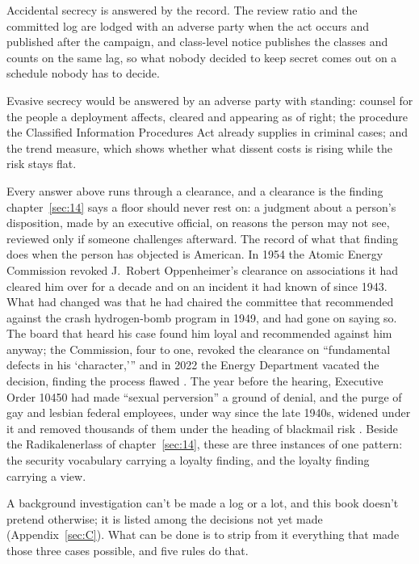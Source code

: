 Accidental secrecy is answered by the record. The review ratio and the committed log are lodged with an adverse party when the act occurs and published after the campaign, and class-level notice publishes the classes and counts on the same lag, so what nobody decided to keep secret comes out on a schedule nobody has to decide.

Evasive secrecy would be answered by an adverse party with standing: counsel for the people a deployment affects, cleared and appearing as of right; the procedure the Classified Information Procedures Act already supplies in criminal cases; and the trend measure, which shows whether what dissent costs is rising while the risk stays flat.


Every answer above runs through a clearance, and a clearance is the finding chapter~\ref{sec:14} says a floor should never rest on: a judgment about a person's disposition, made by an executive official, on reasons the person may not see, reviewed only if someone challenges afterward. The record of what that finding does when the person has objected is American. In 1954 the Atomic Energy Commission revoked J.~Robert Oppenheimer's clearance on associations it had cleared him over for a decade and on an incident it had known of since 1943. What had changed was that he had chaired the committee that recommended against the crash hydrogen-bomb program in 1949, and had gone on saying so. The board that heard his case found him loyal and recommended against him anyway; the Commission, four to one, revoked the clearance on “fundamental defects in his ‘character,’” and in 2022 the Energy Department vacated the decision, finding the process flawed \autocite{aec1954transcript,aec1954decision,doe2022oppenheimer}. The year before the hearing, Executive Order 10450 had made “sexual perversion” a ground of denial, and the purge of gay and lesbian federal employees, under way since the late 1940s, widened under it and removed thousands of them under the heading of blackmail risk \autocite{eo10450,johnson2004lavender}. Beside the Radikalenerlass of chapter~\ref{sec:14}, these are three instances of one pattern: the security vocabulary carrying a loyalty finding, and the loyalty finding carrying a view.

A background investigation can't be made a log or a lot, and this book doesn't pretend otherwise; it is listed among the decisions not yet made (Appendix~\ref{sec:C}). What can be done is to strip from it everything that made those three cases possible, and five rules do that.

